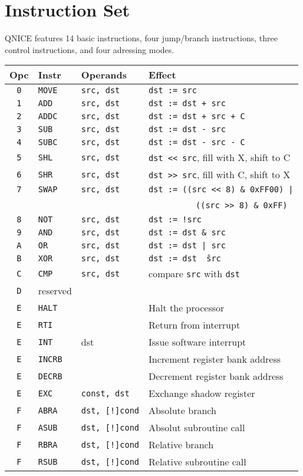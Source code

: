 \documentclass{leaflet}
\begin{document}
 \section{Instruction Set}
  QNICE features 14 basic instructions, four jump/branch instructions, three
  control instructions, and four adressing modes.
  \vspace*{-3mm}
  {\scriptsize
   \begin{center}
    \begin{longtable}{|c|ll|l|}
     \hline
      $\!\!\!$Opc$\!\!\!$&Instr&Operands&Effect\\
     \hline
     \hline
      {\tt 0}&{\tt MOVE}&{\tt src, dst}&{\tt dst := src}\\
      {\tt 1}&{\tt ADD}&{\tt src, dst}&{\tt dst := dst + src}\\
      {\tt 2}&{\tt ADDC}&{\tt src, dst}&{\tt dst := dst + src + C}\\
      {\tt 3}&{\tt SUB}&{\tt src, dst}&{\tt dst := dst - src}\\
      {\tt 4}&{\tt SUBC}&{\tt src, dst}&{\tt dst := dst - src - C}\\
      {\tt 5}&{\tt SHL}&{\tt src, dst}&{\tt dst << src}, fill with X, shift to C\\
      {\tt 6}&{\tt SHR}&{\tt src, dst}&{\tt dst >> src}, fill with C, shift to X\\
      {\tt 7}&{\tt SWAP}&{\tt src, dst}&{\tt dst := ((src << 8) \& 0xFF00) |}\\
             &          &              &~~~~~~~~~~{\tt ((src >> 8) \& 0xFF)}\\
      {\tt 8}&{\tt NOT}&{\tt src, dst}&{\tt dst := !src}\\
      {\tt 9}&{\tt AND}&{\tt src, dst}&{\tt dst := dst \& src}\\
      {\tt A}&{\tt OR}&{\tt src, dst}&{\tt dst := dst | src}\\
      {\tt B}&{\tt XOR}&{\tt src, dst}&{\tt dst := dst \^\ src}\\
      {\tt C}&{\tt CMP}&{\tt src, dst}&compare {\tt src} with {\tt dst}\\
      {\tt D}&reserved&&\\
      {\tt E}&{\tt HALT}&&Halt the processor\\
      {\tt E}&{\tt RTI}&&Return from interrupt\\
      {\tt E}&{\tt INT}&dst&Issue software interrupt\\
      {\tt E}&{\tt INCRB}&&Increment register bank address\\
      {\tt E}&{\tt DECRB}&&Decrement register bank address\\
      {\tt E}&{\tt EXC}&{\tt const, dst}&Exchange shadow register\\
      {\tt F}&{\tt ABRA}&{\tt dst, [!]cond}&Absolute branch\\
      {\tt F}&{\tt ASUB}&{\tt dst, [!]cond}&Absolut subroutine call\\
      {\tt F}&{\tt RBRA}&{\tt dst, [!]cond}&Relative branch\\
      {\tt F}&{\tt RSUB}&{\tt dst, [!]cond}&Relative subroutine call\\
     \hline
    \end{longtable}
   \end{center}
  }
\end{document}
